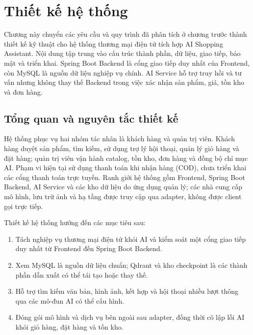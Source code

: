 
\section{Thiết kế hệ thống}
\label{sec:system-design}

Chương này chuyển các yêu cầu và quy trình đã phân tích ở chương trước thành thiết kế kỹ thuật cho hệ thống thương mại điện tử tích hợp AI Shopping Assistant. Nội dung tập trung vào cấu trúc thành phần, dữ liệu, giao tiếp, bảo mật và triển khai. Spring Boot Backend là cổng giao tiếp duy nhất của Frontend, còn MySQL là nguồn dữ liệu nghiệp vụ chính. AI Service hỗ trợ truy hồi và tư vấn nhưng không thay thế Backend trong việc xác nhận sản phẩm, giá, tồn kho và đơn hàng.

\subsection{Tổng quan và nguyên tắc thiết kế}


Hệ thống phục vụ hai nhóm tác nhân là khách hàng và quản trị viên. Khách hàng duyệt sản phẩm, tìm kiếm, sử dụng trợ lý hội thoại, quản lý giỏ hàng và đặt hàng; quản trị viên vận hành catalog, tồn kho, đơn hàng và đồng bộ chỉ mục AI. Phạm vi hiện tại sử dụng thanh toán khi nhận hàng (COD), chưa triển khai các cổng thanh toán trực tuyến. Ranh giới hệ thống gồm Frontend, Spring Boot Backend, AI Service và các kho dữ liệu do ứng dụng quản lý; các nhà cung cấp mô hình, lưu trữ ảnh và hạ tầng được truy cập qua adapter, không được client gọi trực tiếp.

Thiết kế hệ thống hướng đến các mục tiêu sau:

\begin{enumerate}[label=\arabic*., leftmargin=1.15cm]
    \item Tách nghiệp vụ thương mại điện tử khỏi AI và kiểm soát một cổng giao tiếp duy nhất từ Frontend đến Spring Boot Backend.
    \item Xem MySQL là nguồn dữ liệu chuẩn; Qdrant và kho checkpoint là các thành phần dẫn xuất có thể tái tạo hoặc thay thế.
    \item Hỗ trợ tìm kiếm văn bản, hình ảnh, kết hợp và hội thoại nhiều lượt thông qua các mô-đun AI có thể cấu hình.
    \item Đóng gói mô hình và dịch vụ bên ngoài sau adapter, đồng thời cô lập lỗi AI khỏi giỏ hàng, đặt hàng và tồn kho.
\end{enumerate}

